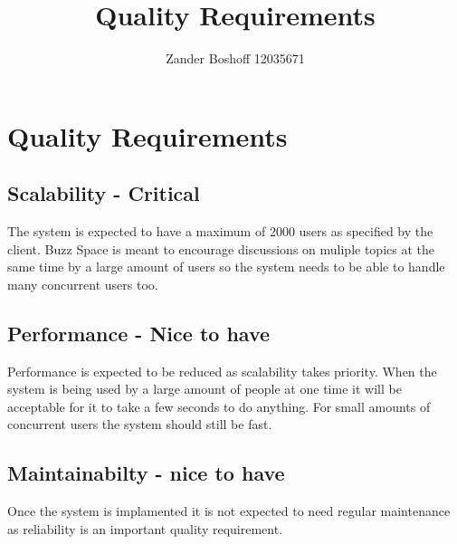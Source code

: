 
\title{Quality Requirements}
\author{Zander Boshoff 12035671}

\section{Quality Requirements}
\subsection{Scalability - Critical}
The system is expected to have a maximum of 2000 users as specified by the client. Buzz Space is meant to encourage discussions on muliple topics at the same time by a large amount of users so the system needs to be able to handle many concurrent users too.

\subsection{Performance - Nice to have}
Performance is expected to be reduced as scalability takes priority. When the system is being used by a large amount of people at one time it will be acceptable for it to take a few seconds to do anything. For small amounts of concurrent users the system should still be fast.

\subsection{Maintainabilty - nice to have}
Once the system is implamented it is not expected to need regular maintenance as reliability is an important quality requirement.



